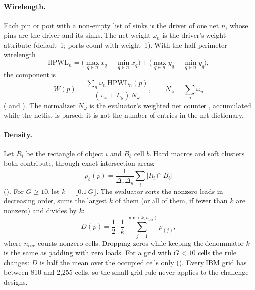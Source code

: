 \paragraph{Wirelength.} Each pin or port with a non-empty list of sinks is the
driver of one net $n$, whose pins are the driver and its sinks. The net weight
$\omega_n$ is the driver's weight attribute (default~1; ports count with weight~1).
With the half-perimeter wirelength
\[
 \mathrm{HPWL}_n=\bigl(\max_{q\in n}x_q-\min_{q\in n}x_q\bigr)
 +\bigl(\max_{q\in n}y_q-\min_{q\in n}y_q\bigr),
\]
the component is
\begin{equation}
  W(p)=\frac{\sum_n\omega_n\,\mathrm{HPWL}_n(p)}{(L_x+L_y)\,N_\omega},
  \qquad N_\omega=\sum_n\omega_n
\end{equation}
( and ). The normalizer $N_\omega$ is the
evaluator's weighted net counter , accumulated while the netlist is
parsed; it is not the number of entries in the net dictionary.

\paragraph{Density.} Let $R_i$ be the rectangle of object $i$ and $B_b$ cell $b$.
Hard macros and soft clusters both contribute, through exact intersection areas:
\begin{equation}
  \rho_b(p)=\frac{1}{\Delta_x\Delta_y}\sum_i\bigl|R_i\cap B_b\bigr|
\end{equation}
(). For $G\ge10$, let $k=\lfloor0.1\,G\rfloor$.
The evaluator sorts the nonzero loads in decreasing order, sums the largest $k$ of
them (or all of them, if fewer than $k$ are nonzero) and divides by $k$:
\begin{equation}
  D(p)=\frac12\cdot\frac1k\sum_{j=1}^{\min(k,n_{\mathrm{occ}})}\rho_{(j)},
\end{equation}
where $n_{\mathrm{occ}}$ counts nonzero cells. Dropping zeros while keeping the
denominator $k$ is the same as padding with zero loads. For a grid with $G<10$
cells the rule changes: $D$ is half the mean over the occupied cells
only (). Every IBM grid has between 810 and 2,255 cells,
so the small-grid rule never applies to the challenge designs.

